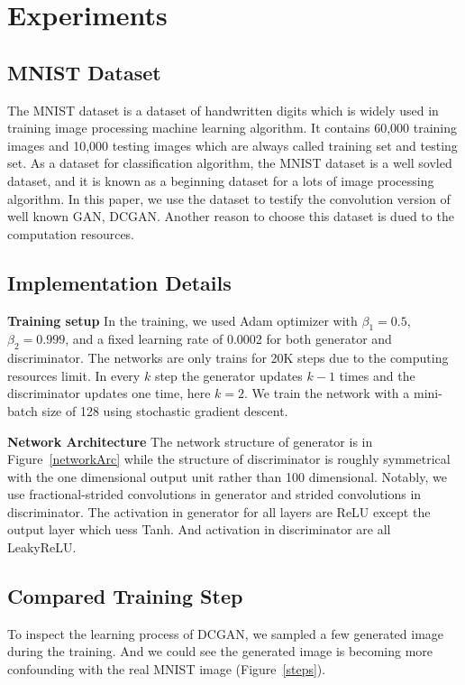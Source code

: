 %
\vspace{-0.1cm}
\section{Experiments}
\label{sec:experiments}

%

\subsection{MNIST Dataset}
The MNIST dataset is a dataset of handwritten digits which is widely used in training image processing machine learning algorithm. It contains 60,000 training images and 10,000 testing images which are always called training set and testing set. As a dataset for classification algorithm, the MNIST dataset is a well sovled dataset, and it is known as a beginning dataset for a lots of image processing algorithm. In this paper, we use the dataset to testify the convolution version of well known GAN, DCGAN. Another reason to choose this dataset is dued to the computation resources.

\subsection{Implementation Details}
\textbf{Training setup}
In the training, we used Adam optimizer with $\beta_1=0.5$, $\beta_2=0.999$, and a fixed learning rate of 0.0002 for both generator and discriminator. The networks are only trains for 20K steps due to the computing resources limit. In every $k$ step the generator updates $k-1$ times and the discriminator updates one time, here $k=2$. We train the network with a mini-batch size of 128 using stochastic gradient descent.

\noindent \textbf{Network Architecture}
The network structure of generator is in Figure~\ref{networkArc} while the structure of discriminator is roughly symmetrical with the one dimensional output unit rather than 100 dimensional. Notably, we use fractional-strided convolutions in generator and strided convolutions in discriminator. The activation in generator for all layers are ReLU except the output layer which uess Tanh. And activation in discriminator are all LeakyReLU.


\subsection{Compared Training Step}
To inspect the learning process of DCGAN, we sampled a few generated image during the training. And we could see the generated image is becoming more confounding with the real MNIST image (Figure~\ref{steps}).

